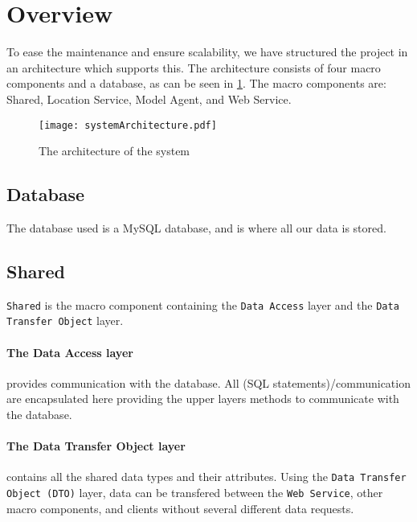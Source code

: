 \section{Overview}
To ease the maintenance and ensure scalability, we have structured the project in an architecture which supports this.
The architecture consists of four macro components and a database, as can be seen in \cref{fig:architecture}. The macro components are: Shared, Location Service, Model Agent, and Web Service.

%

\begin{figure}[H]
\texttt{[image: systemArchitecture.pdf]}
\caption{The architecture of the system}
\label{fig:architecture}
\end{figure}

\subsection*{Database} The database used is a MySQL database, and is where all our data is stored.


\subsection*{Shared}\texttt{Shared} is the macro component containing the \texttt{Data Access} layer and the \texttt{Data Transfer Object} layer.

\paragraph{The Data Access layer} provides communication with the database.
All (SQL statements)/communication are encapsulated here providing the upper layers methods to communicate with the database.

\paragraph{The Data Transfer Object layer} contains all the shared data types and their attributes.
Using the \texttt{Data Transfer Object (DTO)} layer, data can be transfered between the \texttt{Web Service}, other macro components, and clients without several different data requests.


